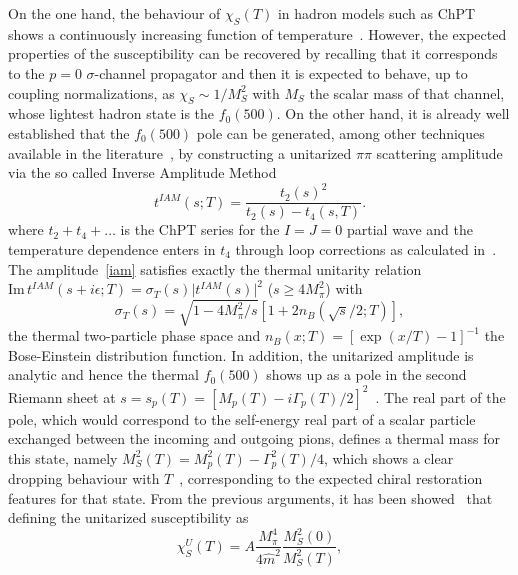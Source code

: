 \documentclass{PoS}
\newcommand{\im}{\mbox{Im}\,}
\begin{document}
On the one hand, the behaviour of $\chi_S(T)$ in hadron models such as ChPT shows a continuously increasing function of temperature~\cite{GomezNicola:2012uc}. However, the expected properties of the susceptibility can be recovered by recalling that it corresponds to the $p=0$ $\sigma$-channel propagator and then it is expected to behave, up to coupling normalizations, as $\chi_S\sim 1/M_S^2$ with $M_S$ the scalar mass of that channel, whose lightest hadron state is the $f_0(500)$.  On the other hand, it is already well established that the $f_0(500)$ pole can be generated, among  other techniques available in the literature~\cite{Pelaez:2015qba}, by constructing  a unitarized $\pi\pi$ scattering amplitude via the so called Inverse Amplitude Method 
\begin{equation}
t^{IAM}(s;T)=\frac{t_2(s)^2}{t_2(s)-t_4(s,T)}.
\label{iam}
\end{equation}
where $t_2+t_4+\dots$ is the ChPT series for the $I=J=0$ partial wave and the temperature dependence enters in $t_4$ through loop corrections as calculated in~\cite{GomezNicola:2002tn}. The amplitude~\eqref{iam} satisfies exactly the thermal unitarity relation $\im t^{IAM}(s+i\epsilon;T)=\sigma_T(s) \vert t^{IAM}(s)\vert^2$ ($s\geq 4M_\pi^2$) with 
$$\sigma_T (s)=\sqrt{1-4M_\pi^2/s}\left[1+2n_B(\sqrt{s}/2;T)\right],$$
the thermal two-particle phase space and $n_B(x;T)=\left[\exp(x/T)-1\right]^{-1}$ the Bose-Einstein distribution function.  In addition, the unitarized amplitude is analytic and hence the thermal $f_0(500)$ shows up as a pole in the second Riemann sheet at $s=s_p (T)=\left[M_p(T)-i\Gamma_p(T)/2\right]^2$~\cite{Dobado:2002xf}. The real part of the pole, which would correspond to the  self-energy real part of a scalar particle exchanged between the incoming and outgoing pions, defines a thermal mass for this state, namely $M_S^2(T)=M_p^2 (T)-\Gamma_p^2(T)/4$, which shows a clear dropping behaviour with $T$~\cite{Nicola:2013vma},  corresponding to the expected chiral restoration features for that state. From the previous arguments, it has been showed~\cite{Nicola:2013vma}  that defining the unitarized susceptibility as
\begin{equation}
\chi_S^U(T)=A\frac{M_\pi^4}{4\hat m^2}\frac{M_S^2(0)}{M_S^2(T)},
\label{susunit}
\end{equation}
\end{document}
